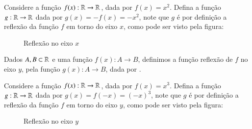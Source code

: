  \begin{exem}
  Considere a função $f(x): \mathbb{R} \to \mathbb{R}$, dada por $f(x)= x^2$. Defina a função $g: \mathbb{R} \to \mathbb{R}$ dada por $g(x)=-f(x)= -x^2$, note que $g$ é por definição a reflexão da função $f$ em torno do eixo $x$, como pode ser visto pela figura:
  
\begin{figure}[H]
   \centering
   \caption{Reflexão no eixo $x$}
  \end{figure}
  
 \end{exem}

 
 Dados $A, B \subset \mathbb{R}$ e uma função $f(x): A \to B$, definimos a função reflexão de $f$ no eixo $y$, pela função $g(x): A \to B$, dada por .
 
 \begin{exem}
  Considere a função $f(x): \mathbb{R} \to \mathbb{R}$, dada por $f(x)= x^3$. Defina a função $g: \mathbb{R} \to \mathbb{R}$ dada por $g(x)=f(-x)= (-x)^3$, note que $g$ é por definição a reflexão da função $f$ em torno do eixo $y$, como pode ser visto pela figura:
  
\begin{figure}[H]
   \centering
   \caption{Reflexão no eixo $y$}
  \end{figure}
  
 \end{exem}
 
